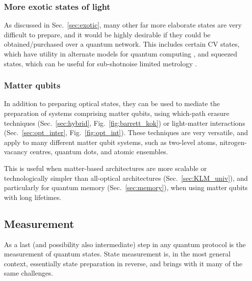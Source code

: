 \documentclass[aps,rmp,twocolumn,amsmath,amssymb,nofootinbib,superscriptaddress]{revtex4}
\begin{document}
%
%

\subsubsection{More exotic states of light}

As discussed in Sec.~\ref{sec:exotic}, many other far more elaborate states are very difficult to prepare, and it would be highly desirable if they could be obtained/purchased over a quantum network. This includes certain CV states, which have utility in alternate models for quantum computing \cite{bib:Menicucci06, Ralph, Lund}, and squeezed states, which can be useful for sub-shotnoise limited metrology \cite{???}.

%
%

\subsubsection{Matter qubits}

In addition to preparing optical states, they can be used to mediate the preparation of systems comprising matter qubits, using which-path erasure techniques (Sec.~\ref{sec:hybrid}, Fig.~\ref{fig:barrett_kok}) or light-matter interactions (Sec.~\ref{sec:opt_inter}, Fig.~\ref{fig:opt_int}). These techniques are very versatile, and apply to many different matter qubit systems, such as two-level atoms, nitrogen-vacancy centres, quantum dots, and atomic ensembles.

This is useful when matter-based architectures are more scalable or technologically simpler than all-optical architectures (Sec.~\ref{sec:KLM_univ}), and particularly for quantum memory (Sec.~\ref{sec:memory}), when using matter qubits with long lifetimes.

%
%

\subsection{Measurement}

As a last (and possibility also intermediate) step in any quantum protocol is the measurement of quantum states. State measurement is, in the most general context, essentially state preparation in reverse, and brings with it many of the same challenges.
\end{document}
